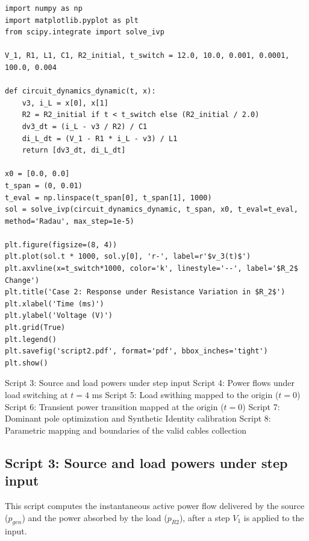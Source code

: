 \documentclass[energies,accept,oneauthor,pdftex]{Definitions/mdpi}
\begin{document}
{\footnotesize
\begin{verbatim}
import numpy as np
import matplotlib.pyplot as plt
from scipy.integrate import solve_ivp

V_1, R1, L1, C1, R2_initial, t_switch = 12.0, 10.0, 0.001, 0.0001, 100.0, 0.004

def circuit_dynamics_dynamic(t, x):
    v3, i_L = x[0], x[1]
    R2 = R2_initial if t < t_switch else (R2_initial / 2.0)
    dv3_dt = (i_L - v3 / R2) / C1
    di_L_dt = (V_1 - R1 * i_L - v3) / L1
    return [dv3_dt, di_L_dt]

x0 = [0.0, 0.0]
t_span = (0, 0.01)
t_eval = np.linspace(t_span[0], t_span[1], 1000)
sol = solve_ivp(circuit_dynamics_dynamic, t_span, x0, t_eval=t_eval, method='Radau', max_step=1e-5)

plt.figure(figsize=(8, 4))
plt.plot(sol.t * 1000, sol.y[0], 'r-', label=r'$v_3(t)$')
plt.axvline(x=t_switch*1000, color='k', linestyle='--', label='$R_2$ Change')
plt.title('Case 2: Response under Resistance Variation in $R_2$')
plt.xlabel('Time (ms)')
plt.ylabel('Voltage (V)')
plt.grid(True)
plt.legend()
plt.savefig('script2.pdf', format='pdf', bbox_inches='tight')
plt.show()
\end{verbatim}
}


Script 3: Source and load powers under step input
Script 4: Power flows under load switching at $t=4$ ms
Script 5: Load swithing mapped to the origin ($t=0$)
Script 6: Transient power transition mapped at the origin ($t=0$)
Script 7: Dominant pole optimization and Synthetic Identity calibration
Script 8: Parametric mapping and boundaries of the valid cables collection

\subsection*{Script 3: Source and load powers under step input}
This script computes the instantaneous active power flow delivered by the source ($p_{gen}$) and the power absorbed by the load ($p_{R2}$), after a step $V_1$ is applied to the input.
\end{document}
